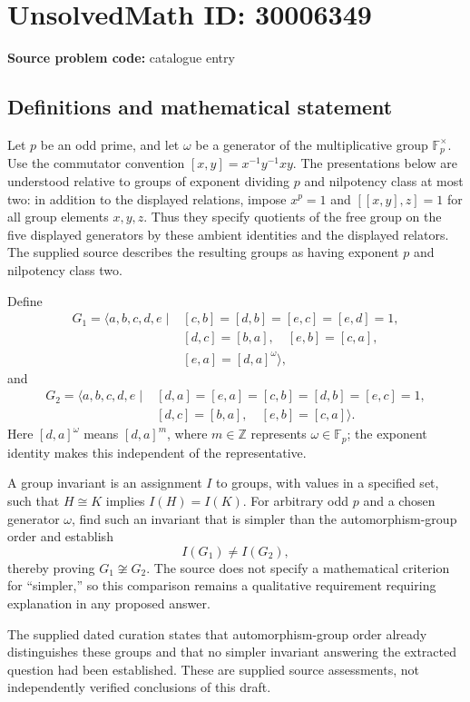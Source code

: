 \documentclass[11pt]{article}
\newcommand{\Z}{\mathbb{Z}}
\newcommand{\F}{\mathbb{F}}
\begin{document}
\section*{UnsolvedMath ID: 30006349}
\textbf{Source problem code:} catalogue entry
\subsection{Definitions and mathematical statement}
Let \(p\) be an odd prime, and let \(\omega\) be a generator of the multiplicative group \(\F_p^\times\). Use the commutator convention \([x,y]=x^{-1}y^{-1}xy\). The presentations below are understood relative to groups of exponent dividing \(p\) and nilpotency class at most two: in addition to the displayed relations, impose \(x^p=1\) and \([[x,y],z]=1\) for all group elements \(x,y,z\). Thus they specify quotients of the free group on the five displayed generators by these ambient identities and the displayed relators. The supplied source describes the resulting groups as having exponent \(p\) and nilpotency class two.

Define
\[
\begin{aligned}
G_1=\langle a,b,c,d,e\mid{}&[c,b]=[d,b]=[e,c]=[e,d]=1,\\
 &[d,c]=[b,a],\quad [e,b]=[c,a],\\
 &[e,a]=[d,a]^\omega\rangle,
\end{aligned}
\]
and
\[
\begin{aligned}
G_2=\langle a,b,c,d,e\mid{}&[d,a]=[e,a]=[c,b]=[d,b]=[e,c]=1,\\
 &[d,c]=[b,a],\quad [e,b]=[c,a]\rangle.
\end{aligned}
\]
Here \([d,a]^\omega\) means \([d,a]^m\), where \(m\in\Z\) represents \(\omega\in\F_p\); the exponent identity makes this independent of the representative.

A group invariant is an assignment \(I\) to groups, with values in a specified set, such that \(H\cong K\) implies \(I(H)=I(K)\). For arbitrary odd \(p\) and a chosen generator \(\omega\), find such an invariant that is simpler than the automorphism-group order and establish
\[
I(G_1)\ne I(G_2),
\]
thereby proving \(G_1\not\cong G_2\). The source does not specify a mathematical criterion for ``simpler,'' so this comparison remains a qualitative requirement requiring explanation in any proposed answer.

The supplied dated curation states that automorphism-group order already distinguishes these groups and that no simpler invariant answering the extracted question had been established. These are supplied source assessments, not independently verified conclusions of this draft.
\end{document}
